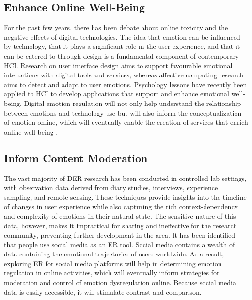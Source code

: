 \documentclass[lettersize,journal]{IEEEtran}
\begin{document}
\subsection{Enhance Online Well-Being}
For the past few years, there has been debate about online toxicity and the negative effects of digital technologies. The idea that emotion can be influenced by technology, that it plays a significant role in the user experience, and that it can be catered to through design is a fundamental component of contemporary HCI. Research on user interface design aims to support favourable emotional interactions with digital tools and services, whereas affective computing research aims to detect and adapt to user emotions. Psychology lessons have recently been applied to HCI to develop applications that support and enhance emotional well-being. Digital emotion regulation will not only help understand the relationship between emotions and technology use but will also inform the conceptualization of emotion online, which will eventually enable the creation of services that enrich online well-being \cite{wadley2022future}.
\subsection{Inform Content Moderation}
The vast majority of DER research has been conducted in controlled lab settings, with observation data derived from diary studies, interviews, experience sampling, and remote sensing. These techniques provide insights into the timeline of changes in user experience while also capturing the rich context-dependency and complexity of emotions in their natural state. The sensitive nature of this data, however, makes it impractical for sharing and ineffective for the research community, preventing further development in the area. It has been identified that people use social media as an ER tool. Social media contains a wealth of data containing the emotional trajectories of users worldwide. As a result, exploring ER for social media platforms will help in determining emotion regulation in online activities, which will eventually inform strategies for moderation and control of emotion dysregulation online. Because social media data is easily accessible, it will stimulate contrast and comparison.
\end{document}
